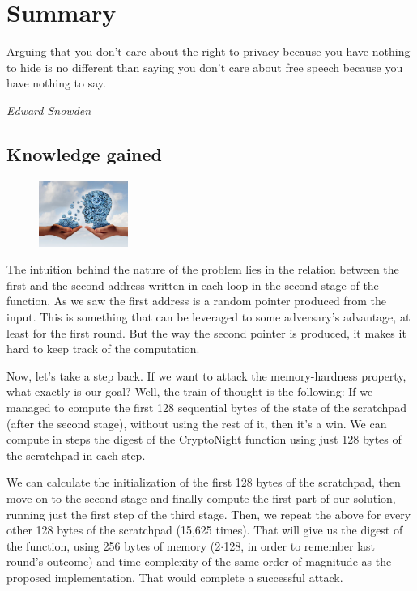 \chapter{Summary}
%
\epigraph{Arguing that you don't care about the right to privacy because you have nothing to hide is no different than saying you don't care about free speech because you have nothing to say.}{\textit{Edward Snowden}}
%
\section{Knowledge gained}
\begin{figure}
\centering
\includegraphics[width=0.26\textwidth]{Images/Summary/knowledge.jpg}
\end{figure}
The intuition behind the nature of the problem lies in the relation between the first and the second address written in each loop in the second stage of the function. As we saw the first address is a random pointer produced from the input. This is something that can be leveraged to some adversary's advantage, at least for the first round. But the way the second pointer is produced, it makes it hard to keep track of the computation.

Now, let's take a step back. If we want to attack the memory-hardness property, what exactly is our goal? Well, the train of thought is the following: If we managed to compute the first 128 sequential bytes of the state of the scratchpad (after the second stage), without using the rest of it, then it's a win. We can compute in steps the digest of the CryptoNight function using just 128 bytes of the scratchpad in each step.

We can calculate the initialization of the first 128 bytes of the scratchpad, then move on to the second stage and finally compute the first part of our solution, running just the first step of the third stage. Then, we repeat the above for every other 128 bytes of the scratchpad (15,625 times). That will give us the digest of the function, using 256 bytes of memory (2$\cdot$128, in order to remember last round's outcome) and time complexity of the same order of magnitude as the proposed implementation. That would complete a successful attack.
\pagebreak

